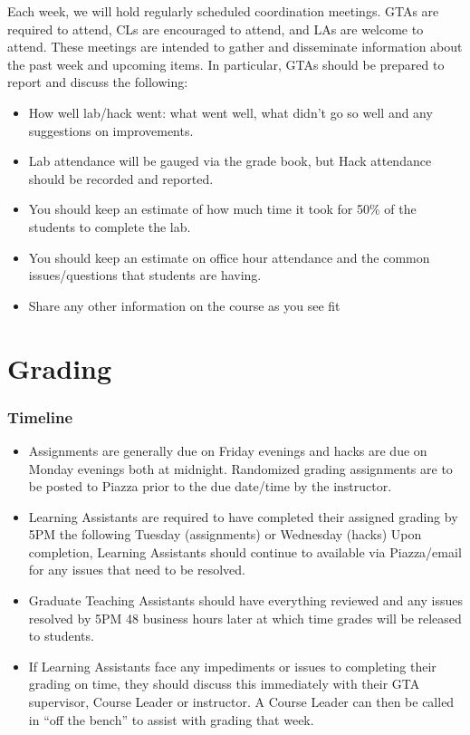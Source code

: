 \documentclass[12pt]{scrartcl}
\begin{document}
Each week, we will hold regularly scheduled coordination meetings.  GTAs are
required to attend, CLs are encouraged to attend, and LAs are welcome to attend.
These meetings are intended to gather and disseminate information about the past
week and upcoming items.  In particular, GTAs should be prepared to report and
discuss the following:
\begin{itemize}
  \item How well lab/hack went: what went well, what didn't go so well and any
  suggestions on improvements.
  \item Lab attendance will be gauged via the grade book, but Hack attendance 
  should be recorded and reported.
  \item You should keep an estimate of how much time it took for 50\% of the
  students to complete the lab.
  \item You should keep an estimate on office hour attendance and the common
  issues/questions that students are having.
  \item Share any other information on the course as you see fit
\end{itemize}

\section*{Grading}

\subsubsection*{Timeline}

\begin{itemize}
  \item Assignments are generally due on Friday evenings and hacks are 
    due on Monday evenings both at midnight.  Randomized grading assignments are to 
    be posted to Piazza prior to the due date/time by the instructor.
  \item Learning Assistants are required to have completed their assigned
    grading by 5PM the following Tuesday (assignments) or Wednesday (hacks)
    Upon completion, Learning Assistants should continue to available via
    Piazza/email for any issues that need to be resolved.
  \item Graduate Teaching Assistants should have everything reviewed and
    any issues resolved by 5PM 48 business hours later at which time grades
    will be released to students.
  \item If Learning Assistants face any impediments or issues to completing
    their grading on time, they should discuss this immediately with their GTA
    supervisor, Course Leader or instructor.  A Course Leader can then be called
    in ``off the bench'' to assist with grading that week.
\end{itemize}
\end{document}
